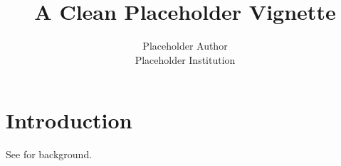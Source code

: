 \documentclass{jss}
\author{Placeholder Author\\Placeholder Institution}
\title{A Clean Placeholder Vignette}
\begin{document}
\section{Introduction}

See \cite{smith2020} for background.
\end{document}
